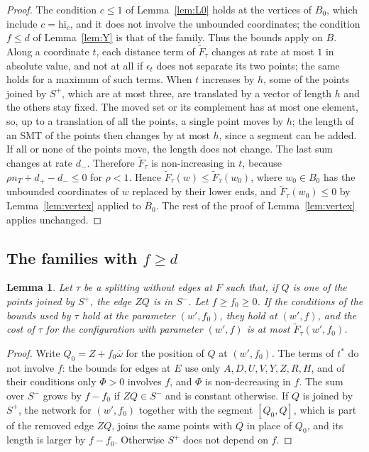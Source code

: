 \documentclass[11pt]{amsart}
\newtheorem{lemma}[theorem]{Lemma}
\theoremstyle{definition}
\theoremstyle{remark}
\numberwithin{equation}{section}
\begin{document}
\begin{proof}
The condition $c\le1$ of Lemma~\ref{lem:L0} holds at the vertices of $B_0$, which include $c=\mathrm{hi}_c$, and it does not involve the unbounded coordinates; the condition $f\le d$ of Lemma~\ref{lem:Y} is that of the family. Thus the bounds apply on $B$. Along a coordinate $t$, each distance term of $\tilde F_\tau$ changes at rate at most $1$ in absolute value, and not at all if $\epsilon_t$ does not separate its two points; the same holds for a maximum of such terms. When $t$ increases by $h$, some of the points joined by $S^+$, which are at most three, are translated by a vector of length $h$ and the others stay fixed. The moved set or its complement has at most one element, so, up to a translation of all the points, a single point moves by $h$; the length of an SMT of the points then changes by at most $h$, since a segment can be added. If all or none of the points move, the length does not change. The last sum changes at rate $d_-$. Therefore $\tilde F_\tau$ is non-increasing in $t$, because $\rho n_T+d_+-d_-\le0$ for $\rho<1$. Hence $\tilde F_\tau(w)\le\tilde F_\tau(w_0)$, where $w_0\in B_0$ has the unbounded coordinates of $w$ replaced by their lower ends, and $\tilde F_\tau(w_0)\le0$ by Lemma~\ref{lem:vertex} applied to $B_0$. The rest of the proof of Lemma~\ref{lem:vertex} applies unchanged.
\end{proof}

\subsection{\texorpdfstring{The families with $f\ge d$}{The families with f >= d}}

\begin{lemma}\label{lem:ext}
Let $\tau$ be a splitting without edges at $F$ such that, if $Q$ is one of the points joined by $S^+$, the edge $ZQ$ is in $S^-$. Let $f\ge f_0\ge0$. If the conditions of the bounds used by $\tau$ hold at the parameter $(w',f_0)$, they hold at $(w',f)$, and the cost of $\tau$ for the configuration with parameter $(w',f)$ is at most $\tilde F_\tau(w',f_0)$.
\end{lemma}

\begin{proof}
Write $Q_0=Z+f_0\bar\omega$ for the position of $Q$ at $(w',f_0)$. The terms of $t^*$ do not involve $f$: the bounds for edges at $E$ use only $A,D,U,V,Y,Z,R,H$, and of their conditions only $\Phi>0$ involves $f$, and $\Phi$ is non-decreasing in $f$. The sum over $S^-$ grows by $f-f_0$ if $ZQ\in S^-$ and is constant otherwise. If $Q$ is joined by $S^+$, the network for $(w',f_0)$ together with the segment $[Q_0,Q]$, which is part of the removed edge $ZQ$, joins the same points with $Q$ in place of $Q_0$, and its length is larger by $f-f_0$. Otherwise $S^+$ does not depend on $f$.
\end{proof}
\end{document}
